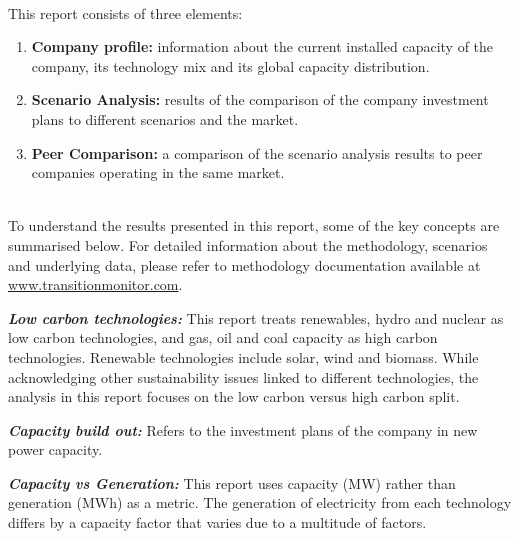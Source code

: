 \documentclass[10pt,table,a4]{article}\usepackage[]{graphicx}\usepackage[]{color}
\newcommand{\Subheader}[1] {\vspace{10pt}{\textbf{\textcolor{Blue1}{\large{#1}}}\vspace{5pt}}}
\begin{document}
			\Subheader{Report Contents}\\	
			This report consists of three elements:
			\vspace{-0.2cm}
			\begin{enumerate}[itemsep=0pt,parsep=2pt,topsep=2pt]
				\item{\textbf{Company profile:} information about the current installed capacity of the company, its technology mix and its global capacity distribution.} 
				\item{\textbf{Scenario Analysis:} results of the comparison of the company investment plans to different scenarios and the market.}
				\item{\textbf{Peer Comparison:} a comparison of the scenario analysis results to peer companies operating in the same market.}
			\end{enumerate}
			\vspace{-0.15cm}
			\Subheader{Key Concepts}\\
			To understand the results presented in this report, some of the key concepts are summarised below. For detailed
			information about the methodology, scenarios and underlying data, please refer to methodology documentation available at \href{http://www.transitionmonitor.com/}{www.transitionmonitor.com}.\par
			
			\textbf{\emph{Low carbon technologies:}} This report treats renewables, hydro and nuclear as low carbon technologies, and gas, oil and coal capacity as high carbon technologies. Renewable technologies include solar, wind and biomass. While acknowledging other sustainability issues linked to different technologies, the analysis in this report focuses on the low carbon versus high carbon split.\par
			
			\textbf{\emph{Capacity build out:}} Refers to the investment plans of the company in new power capacity.\par
			
			\textbf{\emph{Capacity vs Generation:}}  This report uses capacity (MW) rather than generation (MWh) as a metric. The generation of electricity from each technology differs by a capacity factor that varies due to a multitude of factors.\par  
			
\end{document}
